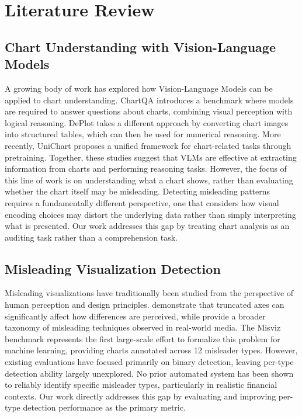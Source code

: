 \section{Literature Review}

\subsection{Chart Understanding with Vision-Language Models}

A growing body of work has explored how Vision-Language Models can be
applied to chart understanding. ChartQA \cite{masry2022chartqa}
introduces a benchmark where models are required to answer questions
about charts, combining visual perception with logical reasoning.
DePlot \cite{liu2023deplot} takes a different approach by converting
chart images into structured tables, which can then be used for
numerical reasoning. More recently, UniChart \cite{masry2023unichart}
proposes a unified framework for chart-related tasks through
pretraining. Together, these studies suggest that VLMs are effective at
extracting information from charts and performing reasoning tasks.
However, the focus of this line of work is on understanding what a
chart shows, rather than evaluating whether the chart itself may be
misleading. Detecting misleading patterns requires a fundamentally
different perspective, one that considers how visual encoding choices
may distort the underlying data rather than simply interpreting what is
presented. Our work addresses this gap by treating chart analysis as an
auditing task rather than a comprehension task.

\subsection{Misleading Visualization Detection}

Misleading visualizations have traditionally been studied from the
perspective of human perception and design principles.
\citet{pandey2015deceptive} demonstrate that truncated axes can
significantly affect how differences are perceived, while
\citet{lisnic2023misleading} provide a broader taxonomy of misleading
techniques observed in real-world media. The Misviz benchmark
\cite{tonglet2025misviz} represents the first large-scale effort to
formalize this problem for machine learning, providing charts annotated
across 12 misleader types. However, existing evaluations have focused
primarily on binary detection, leaving per-type detection ability
largely unexplored. No prior automated system has been shown to
reliably identify specific misleader types, particularly in realistic
financial contexts. Our work directly addresses this gap by evaluating
and improving per-type detection performance as the primary metric.

